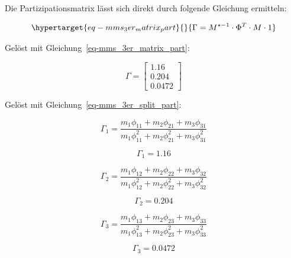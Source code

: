 \documentclass[
  letterpaper,
  DIV=11]{scrreprt}
\begin{document}
Die Partizipationsmatrix lässt sich direkt durch folgende Gleichung
ermitteln:

\begin{equation}\protect\hypertarget{eq-mms_3er_matrix_part}{}{
\Gamma = M^{\star-1} \cdot \Phi^T \cdot M \cdot 1
}\label{eq-mms_3er_matrix_part}\end{equation}

Gelöst mit Gleichung~\ref{eq-mms_3er_matrix_part}:

\begin{equation}\Gamma = \left[\begin{matrix}1.16\\0.204\\0.0472\end{matrix}\right]\end{equation}

Gelöst mit Gleichung~\ref{eq-mms_3er_split_part}:

\begin{equation}\Gamma_{1} = \frac{m_{1} \phi_{11} + m_{2} \phi_{21} + m_{3} \phi_{31}}{m_{1} \phi_{11}^{2} + m_{2} \phi_{21}^{2} + m_{3} \phi_{31}^{2}}\end{equation}

\begin{equation}\Gamma_{1} = 1.16\end{equation}

\begin{equation}\Gamma_{2} = \frac{m_{1} \phi_{12} + m_{2} \phi_{22} + m_{3} \phi_{32}}{m_{1} \phi_{12}^{2} + m_{2} \phi_{22}^{2} + m_{3} \phi_{32}^{2}}\end{equation}

\begin{equation}\Gamma_{2} = 0.204\end{equation}

\begin{equation}\Gamma_{3} = \frac{m_{1} \phi_{13} + m_{2} \phi_{23} + m_{3} \phi_{33}}{m_{1} \phi_{13}^{2} + m_{2} \phi_{23}^{2} + m_{3} \phi_{33}^{2}}\end{equation}

\begin{equation}\Gamma_{3} = 0.0472\end{equation}
\end{document}
